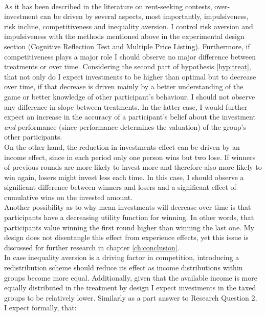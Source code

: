     \leavevmode \\ 
    As it has been described in the literature on rent-seeking contests, over-investment can be driven by several aspects, most importantly, impulsiveness, risk incline, competitiveness and inequality aversion. I control risk aversion and impulsiveness with the methods mentioned above in the experimental design section (Cognitive Reflection Test and Multiple Price Listing). Furthermore, if competitiveness plays a major role I should observe no major difference between treatments or over time. Considering the second part of hypothesis \ref{hyp:treat}, that not only do I expect investments to be higher than optimal but to decrease over time, if that decrease is driven mainly by a better understanding of the game or better knowledge of other participant's behaviour, I should not observe any difference in slope between treatments. In the latter case, I would further expect an increase in the accuracy of a participant's belief about the investment \textit{and} performance (since performance determines the valuation) of the group's other participants.\\
    
    On the other hand, the reduction in investments effect can be driven by an income effect, since in each period only one person wins but two lose. If winners of previous rounds are more likely to invest more and therefore also more likely to win again, losers might invest less each time.  In this case, I should observe a significant difference between winners and losers and a significant effect of cumulative wins on the invested amount.\\
    
    Another possibility as to why mean investments will decrease over time is that participants have a decreasing utility function for winning. In other words, that participants value winning the first round higher than winning the last one. My design does not disentangle this effect from experience effects, yet this issue is discussed for further research in chapter \ref{ch:conclusion}.\\
    
    In case inequality aversion is a driving factor in competition, introducing a redistribution scheme should reduce its effect as income distributions within groups become more equal. Additionally, given that the available income is more equally distributed in the treatment by design I expect investments in the taxed groups to be relatively lower. Similarly as a part answer to Research Question 2, I expect formally, that:\\
    
